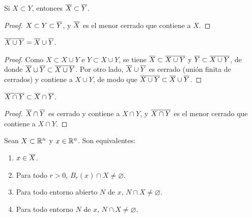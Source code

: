 \begin{prop}
  Si \(X \subset Y\), entonces \(\overline{X} \subset \overline{Y}\).
\end{prop}

\begin{proof}
  \(X \subset Y \subset \overline{Y}\), y \(\overline{X}\) es el menor cerrado que contiene a \(X\).
\end{proof}

\begin{prop}
  \(\overline{X \cup Y} = \overline{X} \cup \overline{Y}\).
\end{prop}

\begin{proof}
  Como \(X \subset X \cup Y\) e \(Y \subset X \cup Y\), se tiene \(\overline{X} \subset \overline{X \cup Y}\) y \(\overline{Y} \subset \overline{X \cup Y}\), de donde \(\overline{X} \cup \overline{Y} \subset \overline{X \cup Y}\). Por otro lado, \(\overline{X} \cup \overline{Y}\) es cerrado (unión finita de cerrados) y contiene a \(X \cup Y\), de modo que \(\overline{X \cup Y} \subset \overline{X} \cup \overline{Y}\).
\end{proof}

\begin{prop}
  \(\overline{X \cap Y} \subset \overline{X} \cap \overline{Y}\).
\end{prop}

\begin{proof}
  \(\overline{X} \cap \overline{Y}\) es cerrado y contiene a \(X \cap Y\), y \(\overline{X \cap Y}\) es el menor cerrado que contiene a \(X \cap Y\).
\end{proof}

\begin{prop}
  Sean \(X \subset \mathbb{R}^n\) y \(x \in \mathbb{R}^n\). Son equivalentes:
  \begin{enumerate}[label=(\arabic*)]
    \item \(x \in \overline{X}\).
    \item Para todo \(r > 0\), \(B_r(x) \cap X \neq \varnothing\).
    \item Para todo entorno abierto \(N\) de \(x\), \(N \cap X \neq \varnothing\).
    \item Para todo entorno \(N\) de \(x\), \(N \cap X \neq \varnothing\).
  \end{enumerate}
\end{prop}

